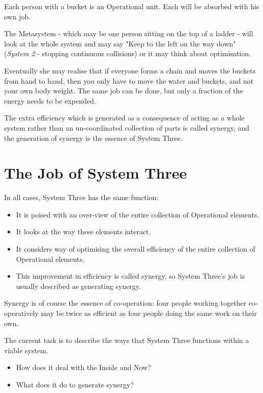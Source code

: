 Each person with a bucket is an Operational unit. Each will be absorbed with his own job.

The Metasystem - which may be one person sitting on the top of a ladder - will look at the whole system and may say "Keep to the left on the way down" (\textit{System 2} - stopping continuous collisions) or it may think about optimisation.

Eventually she may realise that if everyone forms a chain and moves the buckets from hand to hand, then you only have to move the water and buckets, and not your own body weight. The same job can be done, but only a fraction of the energy needs to be expended.

The extra efficiency which is generated as a consequence of acting as a whole system rather than an un-coordinated collection of parts is called synergy, and the generation of synergy is the essence of System Three.

\section*{The Job of System Three}
In all cases, System Three has the same function:

\begin{itemize}
  \item It is poised with an over-view of the entire collection of Operational elements.

  \item It looks at the way these elements interact.

  \item It considers way of optimising the overall efficiency of the entire collection of Operational elements.

  \item This improvement in efficiency is called synergy, so System Three's job is usually described as generating synergy.

\end{itemize}

Synergy is of course the essence of co-operation: four people working together co-operatively may be twice as efficient as four people doing the same work on their own.

The current task is to describe the ways that System Three functions within a viable system.

\begin{itemize}
  \item How does it deal with the Inside and Now?

  \item What does it do to generate synergy?

\end{itemize}

